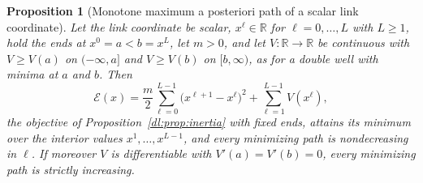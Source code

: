\documentclass[11pt]{article}
\newtheorem{proposition}[theorem]{Proposition}
\theoremstyle{definition}
\theoremstyle{remark}
\newcommand{\R}{\mathbb R}
\begin{document}
\begin{proposition}[Monotone maximum a posteriori path of a scalar link coordinate]
\label{dl:prop:kink}
Let the link coordinate be scalar, $x^\ell\in\R$ for $\ell=0,\dots,L$ with $L\ge1$, hold the ends at $x^0=a<b=x^L$, let $m>0$, and let $V:\R\to\R$ be continuous with $V\ge V(a)$ on $(-\infty,a]$ and $V\ge V(b)$ on $[b,\infty)$, as for a double well with minima at $a$ and $b$. Then
\begin{equation*}
\mathcal E(x)=\frac m2\sum_{\ell=0}^{L-1}\big(x^{\ell+1}-x^\ell\big)^2+\sum_{\ell=1}^{L-1}V(x^\ell),
\end{equation*}
the objective of Proposition~\ref{dl:prop:inertia} with fixed ends, attains its minimum over the interior values $x^1,\dots,x^{L-1}$, and every minimizing path is nondecreasing in $\ell$. If moreover $V$ is differentiable with $V'(a)=V'(b)=0$, every minimizing path is strictly increasing.
\end{proposition}
\end{document}

